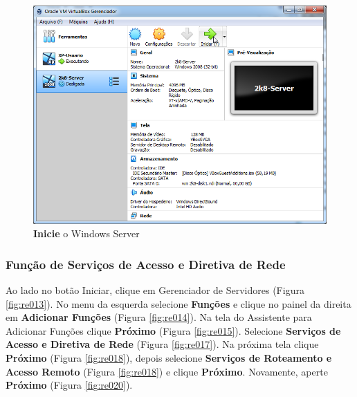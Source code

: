 \documentclass[10pt]{article}
\begin{document}
\begin{figure}[H]
    \centering
    \caption{\textbf{Inicie} o Windows Server}
    \label{fig:re007}
    \includegraphics[width=\linewidth]{images/rede_externa/re007.png}
\end{figure}

\subsubsection{Função de Serviços de Acesso e Diretiva de Rede}
Ao lado no botão Iniciar, clique em Gerenciador de Servidores (Figura \ref{fig:re013}). No menu da esquerda selecione \textbf{Funções} e clique no painel da direita em \textbf{Adicionar Funções} (Figura \ref{fig:re014}). Na tela do Assistente para Adicionar Funções clique \textbf{Próximo} (Figura \ref{fig:re015}). Selecione \textbf{Serviços de Acesso e Diretiva de Rede} (Figura \ref{fig:re017}). Na próxima tela clique \textbf{Próximo} (Figura \ref{fig:re018}), depois selecione \textbf{Serviços de Roteamento e Acesso Remoto} (Figura \ref{fig:re018}) e clique \textbf{Próximo}. Novamente, aperte \textbf{Próximo} (Figura \ref{fig:re020}).
\end{document}
